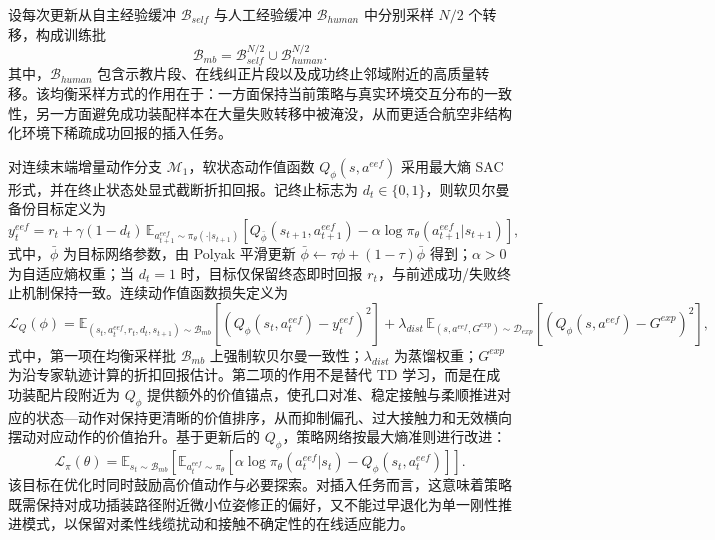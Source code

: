 设每次更新从自主经验缓冲 $\mathcal{B}_{self}$ 与人工经验缓冲 $\mathcal{B}_{human}$ 中分别采样 $N/2$ 个转移，构成训练批
\begin{equation}
\mathcal{B}_{mb}=\mathcal{B}_{self}^{N/2}\cup\mathcal{B}_{human}^{N/2}.
\end{equation}
其中，$\mathcal{B}_{human}$ 包含示教片段、在线纠正片段以及成功终止邻域附近的高质量转移。该均衡采样方式的作用在于：一方面保持当前策略与真实环境交互分布的一致性，另一方面避免成功装配样本在大量失败转移中被淹没，从而更适合航空非结构化环境下稀疏成功回报的插入任务。

对连续末端增量动作分支 $\mathcal{M}_1$，软状态动作值函数 $Q_\phi(s,a^{eef})$ 采用最大熵 SAC 形式，并在终止状态处显式截断折扣回报。记终止标志为 $d_t\in\{0,1\}$，则软贝尔曼备份目标定义为
\begin{equation}
\label{eq:ch4:td-target}
y_t^{eef}=r_t+\gamma(1-d_t)\,\mathbb{E}_{a_{t+1}^{eef}\sim\pi_\theta(\cdot|s_{t+1})}\!\left[Q_{\bar{\phi}}(s_{t+1},a_{t+1}^{eef})-\alpha\log\pi_\theta(a_{t+1}^{eef}|s_{t+1})\right],
\end{equation}
式中，$\bar{\phi}$ 为目标网络参数，由 Polyak 平滑更新 $\bar{\phi}\leftarrow\tau\phi+(1-\tau)\bar{\phi}$ 得到；$\alpha>0$ 为自适应熵权重；当 $d_t=1$ 时，目标仅保留终态即时回报 $r_t$，与前述成功/失败终止机制保持一致。连续动作值函数损失定义为
\begin{equation}
\label{eq:ch4:critic-loss}
\mathcal{L}_{Q}(\phi)=\mathbb{E}_{(s_t,a_t^{eef},r_t,d_t,s_{t+1})\sim\mathcal{B}_{mb}}\!\left[\left(Q_\phi(s_t,a_t^{eef})-y_t^{eef}\right)^2\right]
+\lambda_{dist}\,\mathbb{E}_{(s,a^{eef},G^{exp})\sim\mathcal{D}_{exp}}\!\left[\left(Q_\phi(s,a^{eef})-G^{exp}\right)^2\right],
\end{equation}
式中，第一项在均衡采样批 $\mathcal{B}_{mb}$ 上强制软贝尔曼一致性；$\lambda_{dist}$ 为蒸馏权重；$G^{exp}$ 为沿专家轨迹计算的折扣回报估计。第二项的作用不是替代 TD 学习，而是在成功装配片段附近为 $Q_\phi$ 提供额外的价值锚点，使孔口对准、稳定接触与柔顺推进对应的状态—动作对保持更清晰的价值排序，从而抑制偏孔、过大接触力和无效横向摆动对应动作的价值抬升。基于更新后的 $Q_\phi$，策略网络按最大熵准则进行改进：
\begin{equation}
\label{eq:ch4:actor-loss}
\mathcal{L}_{\pi}(\theta)=\mathbb{E}_{s_t\sim\mathcal{B}_{mb}}\!\left[\mathbb{E}_{a_t^{eef}\sim\pi_\theta}\!\left[\alpha\log\pi_\theta(a_t^{eef}|s_t)-Q_\phi(s_t,a_t^{eef})\right]\right].
\end{equation}
该目标在优化时同时鼓励高价值动作与必要探索。对插入任务而言，这意味着策略既需保持对成功插装路径附近微小位姿修正的偏好，又不能过早退化为单一刚性推进模式，以保留对柔性线缆扰动和接触不确定性的在线适应能力。

